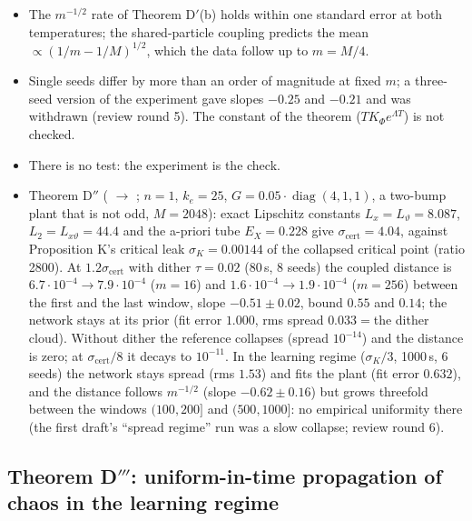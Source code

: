 \begin{itemize}
  \item The $m^{-1/2}$ rate of Theorem D$'$(b) holds within one standard error at both temperatures; the
    shared-particle coupling predicts the mean $\propto(1/m-1/M)^{1/2}$, which the data follow up to $m=M/4$.
  \item Single seeds differ by more than an order of magnitude at fixed $m$; a three-seed version of the experiment
    gave slopes $-0.25$ and $-0.21$ and was withdrawn (review round 5). The constant of the theorem
    ($TK_\Phi e^{\Lambda T}$) is not checked.
  \item There is no test: the experiment is the check.
  \item Theorem D$''$ ( $\to$ ; $n=1$, $k_e=25$,
    $G=0.05\cdot\operatorname{diag}(4,1,1)$, a two-bump plant that is not odd, $M=2048$): exact Lipschitz constants
    $L_x=L_\vartheta=8.087$, $L_2=L_{x\vartheta}=44.4$ and the a-priori tube $E_X=0.228$ give
    $\sigma_{\mathrm{cert}}=4.04$, against Proposition K's critical leak $\sigma_K=0.00144$ of the collapsed critical
    point (ratio 2800). At $1.2\sigma_{\mathrm{cert}}$ with dither $\tau=0.02$ (80\,s, 8 seeds) the coupled distance
    is $6.7\cdot10^{-4}\to7.9\cdot10^{-4}$ ($m=16$) and $1.6\cdot10^{-4}\to1.9\cdot10^{-4}$ ($m=256$) between the
    first and the last window, slope $-0.51\pm0.02$, bound $0.55$ and $0.14$; the network stays at its prior (fit
    error $1.000$, rms spread $0.033={}$the dither cloud). Without dither the reference collapses (spread $10^{-14}$)
    and the distance is zero; at $\sigma_{\mathrm{cert}}/8$ it decays to $10^{-11}$. In the learning regime
    ($\sigma_K/3$, 1000\,s, 6 seeds) the network stays spread (rms $1.53$) and fits the plant (fit error $0.632$),
    and the distance follows $m^{-1/2}$ (slope $-0.62\pm0.16$) but grows threefold between the windows $(100,200]$
    and $(500,1000]$: no empirical uniformity there (the first draft's ``spread regime'' run was a slow collapse;
    review round 6).
\end{itemize}

\subsection{Theorem D\texorpdfstring{$'''$}{'''}: uniform-in-time propagation of chaos in the learning regime}

